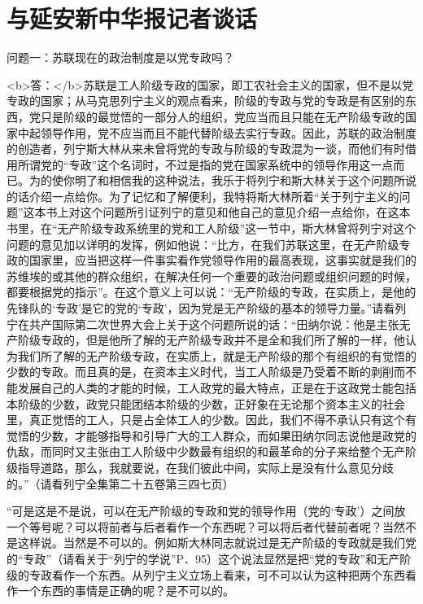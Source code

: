 \section[与延安新中华报记者谈话（一九三八年二日）]{与延安新中华报记者谈话}


问题一：苏联现在的政治制度是以党专政吗？

<b>答：</b>苏联是工人阶级专政的国家，即工农社会主义的国家，但不是以党专政的国家；从马克思列宁主义的观点看来，阶级的专政与党的专政是有区别的东西，党只是阶级的最觉悟的一部分人的组织，党应当而且只能在无产阶级专政的国家中起领导作用，党不应当而且不能代替阶级去实行专政。因此，苏联的政治制度的创造者，列宁斯大林从来未曾将党的专政与阶级的专政混为一谈，而他们有时借用所谓党的“专政”这个名词时，不过是指的党在国家系统中的领导作用这一点而已。为的使你明了和相信我的这种说法，我乐于将列宁和斯大林关于这个问题所说的话介绍一点给你。为了记忆和了解便利，我特将斯大林所着“关于列宁主义的问题”这本书上对这个问题所引证列宁的意见和他自己的意见介绍一点给你，在这本书里，在“无产阶级专政系统里的党和工人阶级”这一节中，斯大林曾将列宁对这个问题的意见加以详明的发挥，例如他说：“比方，在我们苏联这里，在无产阶级专政的国家里，应当把这样一件事实看作党领导作用的最高表现，这事实就是我们的苏维埃的或其他的群众组织，在解决任何一个重要的政治问题或组织问题的时候，都要根据党的指示”。在这个意义上可以说：“无产阶级的专政，在实质上，是他的先锋队的‘专政’是它的党的‘专政’，因为党是无产阶级的基本的领导力量。”请看列宁在共产国际第二次世界大会上关于这个问题所说的话：“田纳尔说：他是主张无产阶级专政的，但是他所了解的无产阶级专政并不是全和我们所了解的一样，他认为我们所了解的无产阶级专政，在实质上，就是无产阶级的那个有组织的有觉悟的少数的专政。而且真的是，在资本主义时代，当工人阶级是乃受着不断的剥削而不能发展自己的人类的才能的时候，工人政党的最大特点，正是在于这政党士能包括本阶级的少数，政党只能团结本阶级的少数，正好象在无论那个资本主义的社会里，真正觉悟的工人，只是占全体工人的少数。因此，我们不得不承认只有这个有觉悟的少数，才能够指导和引导广大的工人群众，而如果田纳尔同志说他是政党的仇敌，而同时又主张由工人阶级中少数最有组织的和最革命的分子来给整个无产阶级指导道路，那么，我就要说，在我们彼此中间，实际上是没有什么意见分歧的。”（请看列宁全集第二十五卷第三四七页）

“可是这是不是说，可以在无产阶级的专政和党的领导作用（党的‘专政’）之间放一个等号呢？可以将前者与后者看作一个东西呢？可以将后者代替前者呢？当然不是这样说。当然是不可以的。例如斯大林同志就说过是无产阶级的专政就是我们党的“专政”（请看关于“列宁的学说”P．95）这个说法显然是把“党的专政”和无产阶级的专政看作一个东西。从列宁主义立场上看来，可不可以认为这种把两个东西看作一个东西的事情是正确的呢？是不可以的。

